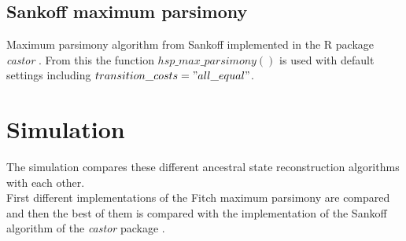 
    \subsection{Sankoff maximum parsimony}
      Maximum parsimony algorithm from Sankoff implemented in the R package \textit{castor} \cite{Louca2017}.
        From this the function \textit{$hsp\_max\_parsimony()$} is used with default settings including
        $transition\_costs="all\_equal"$. \\

  \section{Simulation}\label{sec:methods - simulation}
    The simulation compares these different ancestral state reconstruction algorithms with each 
      other. \\
    First different implementations of the Fitch maximum parsimony are compared and then the best of 
      them is compared with the implementation of the Sankoff algorithm of the \textit{castor} package 
      \cite{Louca2017}.


